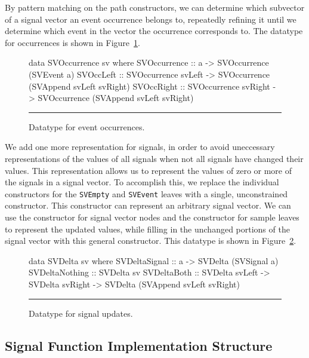 By pattern matching on the path constructors, we can determine which subvector
of a signal vector an event occurrence belongs to, repeatedly refining it until
we determine which event in the vector the occurrence corresponds to. The
datatype for occurrences is shown in Figure~\ref{figure:event_occurrence_datatype}.

\begin{figure}
\begin{code}
data SVOccurrence sv where
  SVOccurrence ::    a
                  -> SVOccurrence (SVEvent a)
  SVOccLeft    ::    SVOccurrence svLeft
                  -> SVOccurrence (SVAppend svLeft svRight)
  SVOccRight   ::    SVOccurrence svRight 
                  -> SVOccurrence (SVAppend svLeft svRight)
\end{code}
\hrule
\caption{Datatype for event occurrences.}
\label{figure:event_occurrence_datatype}
\end{figure}

We add one more representation for signals, in order to avoid uneccessary
representations of the values of all signals when not all signals have changed
their values. This representation allows us to represent the values of zero or
more of the signals in a signal vector. To accomplish this, we replace the
individual constructors for the {\tt SVEmpty} and {\tt SVEvent} leaves with %
a single, unconstrained constructor. This constructor can represent an arbitrary
signal vector. We can use the constructor for signal vector nodes and the 
constructor for sample leaves to represent the updated values, while filling
in the unchanged portions of the signal vector with this general constructor.
This datatype is shown in Figure~\ref{figure:signal_update_datatype}.

\begin{figure}
\begin{code}
data SVDelta sv where
  SVDeltaSignal  ::    a
                    -> SVDelta (SVSignal a)
  SVDeltaNothing ::    SVDelta sv
  SVDeltaBoth    ::    SVDelta svLeft
                    -> SVDelta svRight
                    -> SVDelta (SVAppend svLeft svRight)
\end{code}
\hrule
\caption{Datatype for signal updates.}
\label{figure:signal_update_datatype}
\end{figure}

\subsection{Signal Function Implementation Structure}
\label{subsection:Implementation-Signal_Functions-Signal_Function_Implementation_Structure}

